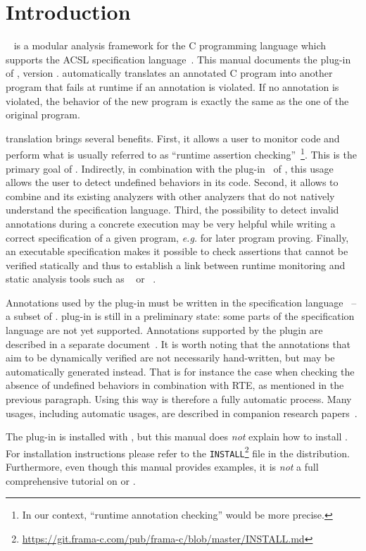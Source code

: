 \chapter{Introduction}

\framac~\cite{userman,fac15} is a modular analysis framework for the C
programming language which supports the ACSL specification
language~\cite{acsl}. This manual documents the \eacsl plug-in of \framac,
version \framacversion. \eacsl
automatically translates an annotated C program into another program that fails
at runtime if an annotation is violated. If no annotation is violated, the
behavior of the new program is exactly the same as the one of the original
program.

\eacsl translation brings several benefits. First, it allows a user to monitor
\C code and perform what is usually referred to as ``runtime assertion
checking''~\cite{runtime-assertion-checking}\footnote{In our context, ``runtime
  annotation checking'' would be more precise.}. This is the primary goal of
\eacsl. Indirectly, in combination with the \rte plug-in~\cite{rte} of \framac,
this
usage allows the user to detect undefined behaviors in its \C code. Second, it
allows to combine \framac and its existing analyzers with other \C analyzers
that do not natively understand the \acsl specification language. Third, the
possibility to detect invalid annotations during a concrete execution may be
very helpful while writing a correct specification of a given program,
\emph{e.g.} for later program proving.  Finally, an executable specification
makes it possible to check assertions that cannot be verified statically and
thus to establish a link between runtime monitoring and static analysis tools
such as \Eva~\cite{eva} or \wpplugin~\cite{wp}.

Annotations used by the plug-in must be written in the \eacsl specification
language~\cite{eacsl,sac13} -- a subset of \acsl. \eacsl plug-in is still in a
preliminary state: some parts of the \eacsl specification language are not yet
supported. Annotations supported by the plugin are described in a separate
document~\cite{eacsl-implem}. It is worth noting that the annotations that aim
to be dynamically verified are not necessarily hand-written, but may be
automatically generated instead. That is for instance the case when checking the
absence of undefined behaviors in combination with RTE, as mentioned in the
previous paragraph. Using \eacsl this way is therefore a fully automatic
process. Many usages, including automatic usages, are described in companion
research papers~\cite{rv13tutorial,rvcubes17tool,signoles18hdr}.

The \eacsl plug-in is installed with \framac, but this manual does \emph{not}
explain how to install \framac.  For installation instructions please refer to
the \texttt{INSTALL}\footnote{
  \url{https://git.frama-c.com/pub/frama-c/blob/master/INSTALL.md}}
file in the \framac distribution.  Furthermore, even though
this manual provides examples, it is \emph{not} a full comprehensive tutorial on
\framac or \eacsl.
